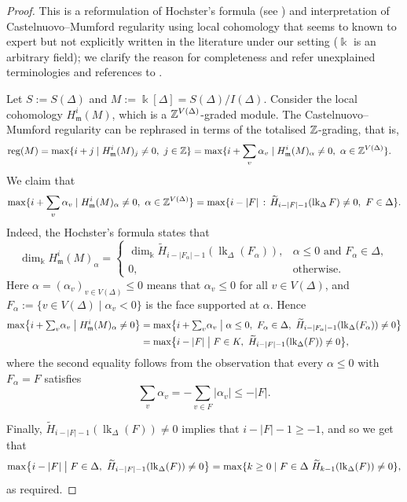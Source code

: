 \documentclass[a4paper,leqno]{amsart}
\begin{document}
\begin{proof}
This is a reformulation of Hochster's formula (see \cite{Hoc77}) and interpretation of Castelnuovo--Mumford regularity using local cohomology that seems to known to expert but not explicitly written in the literature under our setting ($\Bbbk$ is an arbitrary field); we clarify the reason for completeness and refer unexplained terminologies and references to \cite[Section A.7]{HH11}.  

Let $S:=S(\Delta)$ and $M:=\Bbbk[\Delta]=S(\Delta)/I(\Delta)$.
Consider the local cohomology $H^i_{\mathfrak{m}}(M)$, which is a $\mathbb{Z}^{V(\Delta)}$-graded module.  The Castelnuovo--Mumford regularity can be rephrased in terms of the totalised $\mathbb{Z}$-grading, that is,
\begin{align*}
\operatorname{reg}(M) 
&=\max\{i+j\mid H^i_{\mathfrak m}(M)_j\neq 0, \ j\in \ZZ\}
=\max \{ i+\sum_v \alpha_v \mid H^i_{\mathfrak m}(M)_\alpha \neq 0, \ \alpha\in \ZZ^{V(\Delta)}\}.
\end{align*}
We claim that
\[
\max \{ i+\sum_v \alpha_v \mid H^i_{\mathfrak m}(M)_\alpha \neq 0, \ \alpha\in \ZZ^{V(\Delta)}\}
=\max\{i-|F| \,:\, \widetilde H_{i-|F|-1}(\operatorname{lk}_\Delta F)\neq0,\ F\in \Delta\}.
\]
Indeed, the Hochster's formula \cite[Theorem A.7.3]{HH11} states that
\begin{equation}\label{eq:hochster-local-cohomology}
\dim_{\Bbbk}H^i_{\mathfrak m}(M)_\alpha=
\begin{cases}
\dim_{\Bbbk}\widetilde H_{i-|F_\alpha|-1}(\operatorname{lk}_\Delta(F_\alpha)), & \alpha\leq0\text{ and }F_\alpha\in \Delta,\\
0, & \text{otherwise}.
\end{cases}
\end{equation}
Here $\alpha =(\alpha_v)_{v\in V(\Delta)} \le 0$ means that $\alpha_v\le 0$ for all $v\in V(\Delta)$, and $F_\alpha:=\{v\in V(\Delta)\mid\alpha_v<0\}$ is the face supported at $\alpha$.  Hence
\begin{align*}
\max\bigl\{i+{\textstyle\sum_v}\alpha_v \bigm| H^i_{\mathfrak m}(M)_\alpha\neq0\bigr\}
&=\max\bigl\{i+{\textstyle\sum_v}\alpha_v \bigm| \alpha\leq0,\ F_\alpha\in \Delta,\ \widetilde H_{i-|F_\alpha|-1}(\operatorname{lk}_\Delta (F_\alpha))\neq0\bigr\}\\
&=\max\bigl\{i-|F| \bigm| F\in K,\ \widetilde H_{i-|F|-1}(\operatorname{lk}_\Delta(F))\neq0\bigr\},
\end{align*}
where the second equality follows from the observation that every $\alpha\leq0$ with $F_\alpha=F$ satisfies
\[
\sum_v\alpha_v=-\sum_{v\in F}|\alpha_v|\leq-|F|.
\]

Finally, $\widetilde{H}_{i-|F|-1}(\operatorname{lk}_\Delta (F))\neq 0$ implies that $i-|F|-1\ge -1$, and so we get that
\[
\max\bigl\{i-|F| \bigm| F\in \Delta,\ \widetilde H_{i-|F|-1}(\operatorname{lk}_\Delta (F))\neq0\bigr\} = \max \{ k\ge 0 \mid F\in \Delta\ \widetilde H_{k-1}(\operatorname{lk}_\Delta (F))\neq0 \}, 
\]
as required.
\end{proof}
\end{document}
